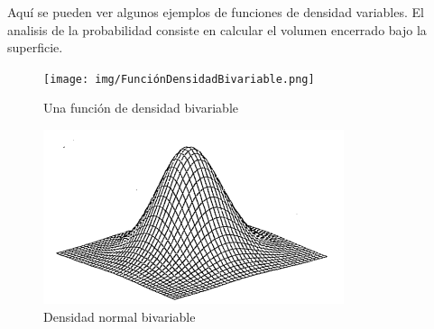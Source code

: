 Aquí se pueden ver algunos ejemplos de funciones de densidad variables. El
analisis de la probabilidad consiste en calcular el volumen encerrado
bajo la superficie.
\vspace*{\fill}
	\begin{figure}[htbp]
        \center
        \texttt{[image: img/FunciónDensidadBivariable.png]}
        \caption{Una función de densidad bivariable}
    \end{figure}
\vspace*{\fill}
\vspace*{\fill}
    \begin{figure}[htbp]
        \center
        \includegraphics[scale=1]{img/NormalBivariable.png}
        \caption{Densidad normal bivariable}
    \end{figure}
\vspace*{\fill}

\newpage

